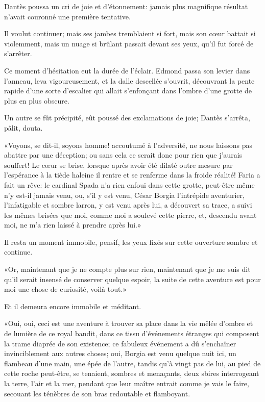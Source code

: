 Dantès poussa un cri de joie et d'étonnement: jamais plus magnifique résultat n'avait couronné une première tentative.

Il voulut continuer; mais ses jambes tremblaient si fort, mais son cœur battait si violemment, mais un nuage si brûlant passait devant ses yeux, qu'il fut forcé de s'arrêter.

Ce moment d'hésitation eut la durée de l'éclair. Edmond passa son levier dans l'anneau, leva vigoureusement, et la dalle descellée s'ouvrit, découvrant la pente rapide d'une sorte d'escalier qui allait s'enfonçant dans l'ombre d'une grotte de plus en plus obscure.

Un autre se fût précipité, eût poussé des exclamations de joie; Dantès s'arrêta, pâlit, douta.

«Voyons, se dit-il, soyons homme! accoutumé à l'adversité, ne nous laissons pas abattre par une déception; ou sans cela ce serait donc pour rien que j'aurais souffert! Le cœur se brise, lorsque après avoir été dilaté outre mesure par l'espérance à la tiède haleine il rentre et se renferme dans la froide réalité! Faria a fait un rêve: le cardinal Spada n'a rien enfoui dans cette grotte, peut-être même n'y est-il jamais venu, ou, s'il y est venu, César Borgia l'intrépide aventurier, l'infatigable et sombre larron, y est venu après lui, a découvert sa trace, a suivi les mêmes brisées que moi, comme moi a soulevé cette pierre, et, descendu avant moi, ne m'a rien laissé à prendre après lui.»

Il resta un moment immobile, pensif, les yeux fixés sur cette ouverture sombre et continue.

«Or, maintenant que je ne compte plus sur rien, maintenant que je me suis dit qu'il serait insensé de conserver quelque espoir, la suite de cette aventure est pour moi une chose de curiosité, voilà tout.»

Et il demeura encore immobile et méditant.

«Oui, oui, ceci est une aventure à trouver sa place dans la vie mêlée d'ombre et de lumière de ce royal bandit, dans ce tissu d'événements étranges qui composent la trame diaprée de son existence; ce fabuleux événement a dû s'enchaîner invinciblement aux autres choses; oui, Borgia est venu quelque nuit ici, un flambeau d'une main, une épée de l'autre, tandis qu'à vingt pas de lui, au pied de cette roche peut-être, se tenaient, sombres et menaçants, deux sbires interrogeant la terre, l'air et la mer, pendant que leur maître entrait comme je vais le faire, secouant les ténèbres de son bras redoutable et flamboyant.

